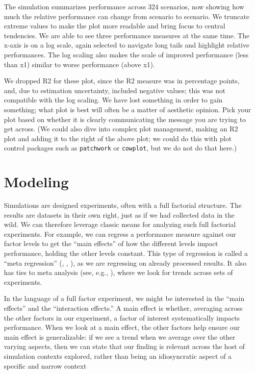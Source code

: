 \documentclass[
]{book}
\begin{document}
The simulation summarizes performance across 324 scenarios, now showing how much the relative performance can change from scenario to scenario.
We truncate extreme values to make the plot more readable and bring focus to central tendencies.
We are able to see three performance measures at the same time.
The x-axis is on a log scale, again selected to navigate long tails and highlight relative performances.
The log scaling also makes the scale of improved performance (less than x1) similar to worse performance (above x1).

We dropped R2 for these plot, since the R2 measure was in percentage points, and, due to estimation uncertainty, included negative values; this was not compatible with the log scaling.
We have lost something in order to gain something; what plot is best will often be a matter of aesthetic opinion.
Pick your plot based on whether it is clearly communicating the message you are trying to get across.
(We could also dive into complex plot management, making an R2 plot and adding it to the right of the above plot; we could do this with plot control packages such as \texttt{patchwork} or \texttt{cowplot}, but we do not do that here.)

\section{Modeling}\label{modeling}

Simulations are designed experiments, often with a full factorial structure.
The results are datasets in their own right, just as if we had collected data in the wild.
We can therefore leverage classic means for analyzing such full factorial experiments.
For example, we can regress a performance measure against our factor levels to get the ``main effects'' of how the different levels impact performance, holding the other levels constant.
This type of regression is called a ``meta regression'' (\citet{kleijnen1981regression}, \citet{friedman1988metamodel}, \citet{gilbert2024multilevel}), as we are regressing on already processed results.
It also has ties to meta analysis (see, e.g., \citet{borenstein2021introduction}), where we look for trends across sets of experiments.

In the language of a full factor experiment, we might be interested in the ``main effects'' and the ``interaction effects.''
A main effect is whether, averaging across the other factors in our experiment, a factor of interest systematically impacts performance.
When we look at a main effect, the other factors help ensure our main effect is generalizable: if we see a trend when we average over the other varying aspects, then we can state that our finding is relevant across the host of simulation contexts explored, rather than being an idiosyncratic aspect of a specific and narrow context
\end{document}
